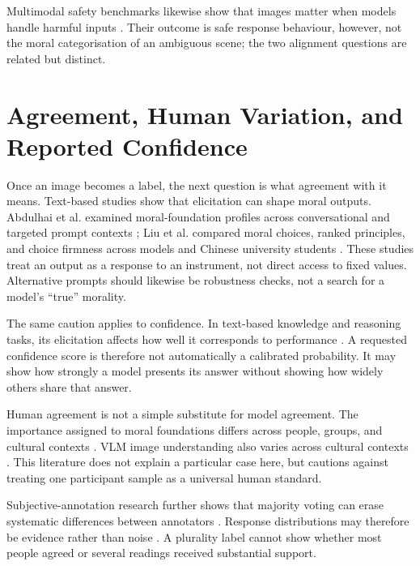 \FloatBarrier

Multimodal safety benchmarks likewise show that images matter when models
handle harmful inputs \cite{liu2024mmsafetybench,ying2024safebench}. Their
outcome is safe response behaviour, however, not the moral categorisation of
an ambiguous scene; the two alignment questions are related but distinct.


\section{Agreement, Human Variation, and Reported Confidence}
\label{sec:model_uncertainty}

Once an image becomes a label, the next question is what agreement with it
means. Text-based studies show that elicitation can shape moral outputs.
Abdulhai et al. examined moral-foundation profiles across conversational and
targeted prompt contexts \cite{abdulhai2024foundations}; Liu et al. compared
moral choices, ranked principles, and choice firmness across models and Chinese
university students \cite{liu2024pluralistic}. These studies treat an output
as a response to an instrument, not direct access to fixed values. Alternative
prompts should likewise be robustness checks, not a search for a model's
``true'' morality.

The same caution applies to confidence. In text-based knowledge and reasoning
tasks, its elicitation affects how well it corresponds to performance
\cite{xiong2024uncertainty}. A requested confidence score is therefore not
automatically a calibrated probability. It may show how strongly a model
presents its answer without showing how widely others share that answer.

Human agreement is not a simple substitute for model agreement. The importance
assigned to moral foundations differs across people, groups, and cultural
contexts \cite{graham2009liberals,graham2011mapping,qian2024cultural,
atari2023weird}. VLM image understanding also varies across cultural contexts
\cite{yadav2025beyond,ananthram2024perspective}. This literature does not
explain a particular case here, but cautions against treating one participant
sample as a universal human standard.

Subjective-annotation research further shows that majority voting can erase
systematic differences between annotators \cite{davani2022dealing}. Response
distributions may therefore be evidence rather than noise
\cite{uma2021disagreement}. A plurality label cannot show whether most people
agreed or several readings received substantial support.

